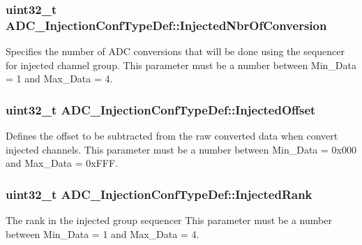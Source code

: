 \subsubsection[{\texorpdfstring{Injected\+Nbr\+Of\+Conversion}{InjectedNbrOfConversion}}]{\setlength{\rightskip}{0pt plus 5cm}uint32\+\_\+t A\+D\+C\+\_\+\+Injection\+Conf\+Type\+Def\+::\+Injected\+Nbr\+Of\+Conversion}\hypertarget{struct_a_d_c___injection_conf_type_def_ac59f9795b1b8c4ce6745d99f8231b768}{}\label{struct_a_d_c___injection_conf_type_def_ac59f9795b1b8c4ce6745d99f8231b768}
Specifies the number of A\+DC conversions that will be done using the sequencer for injected channel group. This parameter must be a number between Min\+\_\+\+Data = 1 and Max\+\_\+\+Data = 4. 
\subsubsection[{\texorpdfstring{Injected\+Offset}{InjectedOffset}}]{\setlength{\rightskip}{0pt plus 5cm}uint32\+\_\+t A\+D\+C\+\_\+\+Injection\+Conf\+Type\+Def\+::\+Injected\+Offset}\hypertarget{struct_a_d_c___injection_conf_type_def_ac7d28d71ec3aec4d1587ee04fc585f09}{}\label{struct_a_d_c___injection_conf_type_def_ac7d28d71ec3aec4d1587ee04fc585f09}
Defines the offset to be subtracted from the raw converted data when convert injected channels. This parameter must be a number between Min\+\_\+\+Data = 0x000 and Max\+\_\+\+Data = 0x\+F\+FF. 
\subsubsection[{\texorpdfstring{Injected\+Rank}{InjectedRank}}]{\setlength{\rightskip}{0pt plus 5cm}uint32\+\_\+t A\+D\+C\+\_\+\+Injection\+Conf\+Type\+Def\+::\+Injected\+Rank}\hypertarget{struct_a_d_c___injection_conf_type_def_af8a1717c0f5a5d0c7a705224f28a844f}{}\label{struct_a_d_c___injection_conf_type_def_af8a1717c0f5a5d0c7a705224f28a844f}
The rank in the injected group sequencer This parameter must be a number between Min\+\_\+\+Data = 1 and Max\+\_\+\+Data = 4. 
